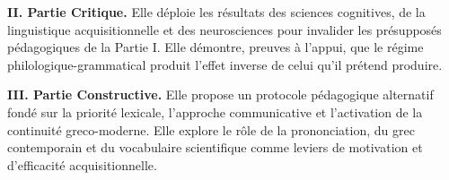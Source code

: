 \textbf{II. Partie Critique.} Elle déploie les résultats des sciences cognitives, de la linguistique acquisitionnelle et des neurosciences pour invalider les présupposés pédagogiques de la Partie I. Elle démontre, preuves à l'appui, que le régime philologique-grammatical produit l'effet inverse de celui qu'il prétend produire.

\textbf{III. Partie Constructive.} Elle propose un protocole pédagogique alternatif fondé sur la priorité lexicale, l'approche communicative et l'activation de la continuité greco-moderne. Elle explore le rôle de la prononciation, du grec contemporain et du vocabulaire scientifique comme leviers de motivation et d'efficacité acquisitionnelle.
